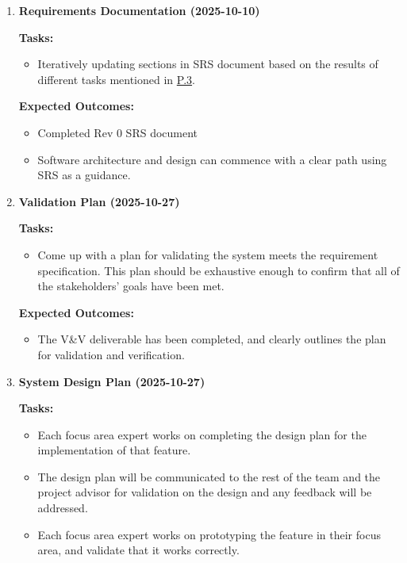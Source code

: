 \documentclass[12pt]{article}
\theoremstyle{definition}
\begin{document}
\begin{enumerate}
  \vspace{0.8em}

  \item \textbf{Requirements Documentation (2025-10-10)}  

  \textbf{Tasks:}
  \begin{itemize}
      \item Iteratively updating sections in SRS document based on the results 
      of different tasks mentioned in \hyperref[item: p3]{P.3}. 
  \end{itemize}

  \textbf{Expected Outcomes:}
  \begin{itemize}
      \item Completed Rev 0 SRS document
      \item Software architecture and design can commence with a clear path 
      using SRS as a guidance. 
  \end{itemize}

  \vspace{0.8em}

  \item \textbf{Validation Plan (2025-10-27)}  

  \textbf{Tasks:}
  \begin{itemize}
      \item Come up with a plan for validating the system meets the requirement 
      specification.
      This plan should be exhaustive enough to confirm that all of the
      stakeholders' goals have been met. 
  \end{itemize}

  \textbf{Expected Outcomes:}
  \begin{itemize}
      \item The V\&V deliverable has been completed, and clearly outlines the 
      plan for validation and verification. 
  \end{itemize}

  \vspace{0.8em}

  \item \textbf{System Design Plan (2025-10-27)}  

  \textbf{Tasks:}
  \begin{itemize}
      \item Each focus area expert works on completing the design plan for the 
      implementation of that feature. 
      \item The design plan will be communicated to the rest of the team and the
       project advisor for validation on the design
      and any feedback will be addressed. 
      \item Each focus area expert works on prototyping the feature in their 
      focus area, and validate that it works correctly. 
  \end{itemize}


\end{enumerate}
\end{document}
